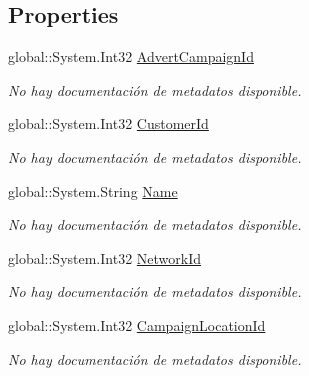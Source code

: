 \subsection*{Properties}
\begin{DoxyCompactItemize}
\item 
global\-::\-System.\-Int32 \hyperlink{class_game_memory_1_1_advert_campaigns_ac2975a0fe8a976df5913d28aad480de8}{Advert\-Campaign\-Id}
\begin{DoxyCompactList}\small\item\em No hay documentación de metadatos disponible. \end{DoxyCompactList}\item 
global\-::\-System.\-Int32 \hyperlink{class_game_memory_1_1_advert_campaigns_a3bbff19846dd4093f2e35a474d46052f}{Customer\-Id}
\begin{DoxyCompactList}\small\item\em No hay documentación de metadatos disponible. \end{DoxyCompactList}\item 
global\-::\-System.\-String \hyperlink{class_game_memory_1_1_advert_campaigns_a21f383f075ec3feed11b31fae8b68776}{Name}
\begin{DoxyCompactList}\small\item\em No hay documentación de metadatos disponible. \end{DoxyCompactList}\item 
global\-::\-System.\-Int32 \hyperlink{class_game_memory_1_1_advert_campaigns_ab1f17469e47f312a306fcb0b971a51d8}{Network\-Id}
\begin{DoxyCompactList}\small\item\em No hay documentación de metadatos disponible. \end{DoxyCompactList}\item 
global\-::\-System.\-Int32 \hyperlink{class_game_memory_1_1_advert_campaigns_ab079c6a8af8543da827b0ddee5ff574b}{Campaign\-Location\-Id}
\begin{DoxyCompactList}\small\item\em No hay documentación de metadatos disponible. \end{DoxyCompactList}\item 

\end{DoxyCompactItemize}
